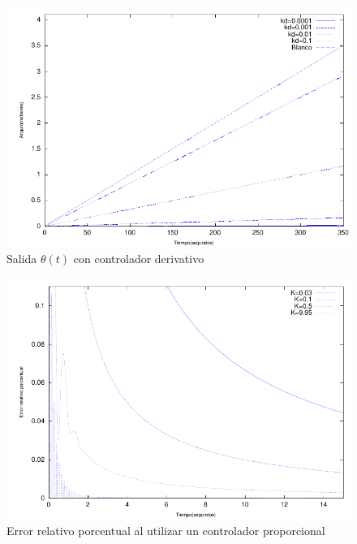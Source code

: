 \documentclass{sig-alternate}
\begin{document}
\begin{figure}[hp]
\label{mDerivativo}
\centering
\includegraphics[scale=0.8]{graficos/mDerivativo}
\caption{Salida $\theta(t)$ con controlador derivativo}
\end{figure}

\begin{figure}[hp]
\label{errorPorcentualMProporcional}
\centering
\includegraphics[scale=0.8]{graficos/errorPorcentualMProporcional}
\caption{Error relativo porcentual al utilizar un controlador proporcional}
\end{figure}
\end{document}
